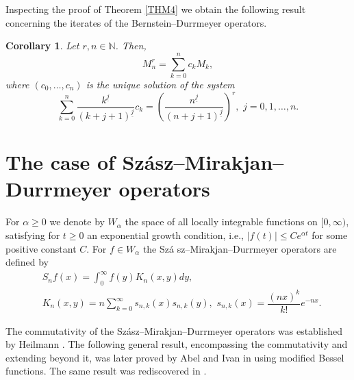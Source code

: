 \documentclass[12pt,reqno]{article}
\newtheorem{corollary}[theorem]{Corollary}
\begin{document}
Inspecting the proof of Theorem \ref{THM4} we obtain the following result
concerning the iterates of the Bernstein--Durrmeyer operators.

\begin{corollary}
Let $r,n\in {\mathbb{N}}$. Then, 
\begin{equation*}
M_n^r=\sum_{k=0}^n c_kM_k,
\end{equation*}
where $(c_0,\dots,c_n)$ is the unique solution of the system 
\begin{equation*}
\displaystyle \sum_{k=0}^n\dfrac{k^{\underline{j}}}{(k+j+1)^{\underline{j}}}%
c_k=\left(\dfrac{n^{\underline{j}}}{(n+j+1)^{\underline{j}}}\right)^r,\, \,
j=0,1,\dots,n.
\end{equation*}
\end{corollary}

\section{The case of Sz\'{a}sz--Mirakjan--Durrmeyer operators}

\label{sec4}

For $\alpha \geq 0$ we denote by $W_{\alpha }$ the space of all locally
integrable functions on $[0,\infty )$, satisfying for $t\geq 0$ an
exponential growth condition, i.e., $|f(t)|\leq Ce^{\alpha t}$ for some
positive constant $C$. For $f\in W_{\alpha }$ the Sz\'{a}%
sz--Mirakjan--Durrmeyer operators are defined by 
\begin{align*}
& S_{n}f(x)=\int_{0}^{\infty }f(y)K_{n}(x,y)dy, \\
& K_{n}(x,y)=n\sum_{k=0}^{\infty }s_{n,k}(x)s_{n,k}(y),\, \,s_{n,k}(x)=%
\dfrac{(nx)^{k}}{k!}e^{-nx}.
\end{align*}

The commutativity of the Sz\'{a}sz--Mirakjan--Durrmeyer operators was
established by Heilmann \cite{Hei}. The following general result,
encompassing the commutativity and extending beyond it, was later proved by
Abel and Ivan in \cite{Abel-Ivan-Varna-CTF2005-proc-2006} using modified
Bessel functions. The same result was rediscovered in \cite[Theorem 1]{S}.

\end{document}
